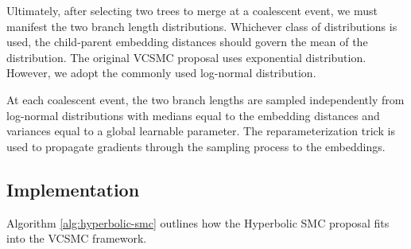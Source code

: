\documentclass{article}
\begin{document}
Ultimately, after selecting two trees to merge at a coalescent event, we must manifest the two branch length distributions. Whichever class of distributions is used, the child-parent embedding distances should govern the mean of the distribution. The original VCSMC proposal uses exponential distribution. However, we adopt the commonly used log-normal distribution.


At each coalescent event, the two branch lengths are sampled independently from log-normal distributions with medians equal to the embedding distances and variances equal to a global learnable parameter. The reparameterization trick is used to propagate gradients through the sampling process to the embeddings.


\subsection{Implementation}


Algorithm \ref{alg:hyperbolic-smc} outlines how the Hyperbolic SMC proposal fits into the VCSMC framework.
\end{document}
